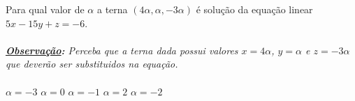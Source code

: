 Para qual valor de $\alpha$ a terna $(4\alpha,\alpha,-3\alpha)$ é solução da equação linear $5x-15y+z=-6$.\\\vspace{-3mm}\\
{\it {\bf\underline{Observação}:} Perceba que a terna dada possui valores $x=4\alpha$, $y=\alpha$ e $z=-3\alpha$ que deverão ser substituidos na equação.}\\\vspace{-1cm}\\

$\alpha=-3$
$\alpha=0$
$\alpha=-1$
$\alpha=2$
$\alpha=-2$


